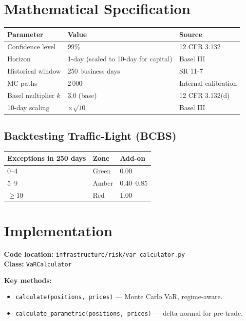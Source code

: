 \documentclass{apex_mdd}
\begin{document}
\section{Mathematical Specification}

\begin{center}
\small
\begin{tabular}{lll}
\toprule
\textbf{Parameter} & \textbf{Value} & \textbf{Source} \\
\midrule
Confidence level   & 99\%           & 12 CFR 3.132 \\
Horizon            & 1-day (scaled to 10-day for capital) & Basel III \\
Historical window  & 250 business days & SR 11-7 \\
MC paths           & 2\,000         & Internal calibration \\
Basel multiplier $k$ & 3.0 (base)   & 12 CFR 3.132(d) \\
10-day scaling     & $\times\sqrt{10}$ & Basel III \\
\bottomrule
\end{tabular}
\end{center}

\subsection{Backtesting Traffic-Light (BCBS)}
\begin{center}
\small
\begin{tabular}{lll}
\toprule
\textbf{Exceptions in 250 days} & \textbf{Zone} & \textbf{Add-on} \\
\midrule
0--4   & Green & 0.00 \\
5--9   & Amber & 0.40--0.85 \\
$\geq 10$ & Red & 1.00 \\
\bottomrule
\end{tabular}
\end{center}

\section{Implementation}

\textbf{Code location:} \texttt{infrastructure/risk/var\_calculator.py}\\
\textbf{Class:} \texttt{VaRCalculator}

\textbf{Key methods:}
\begin{itemize}
  \item \texttt{calculate(positions, prices)} — Monte Carlo VaR, regime-aware.
  \item \texttt{calculate\_parametric(positions, prices)} — delta-normal for pre-trade.
\end{itemize}
\end{document}
